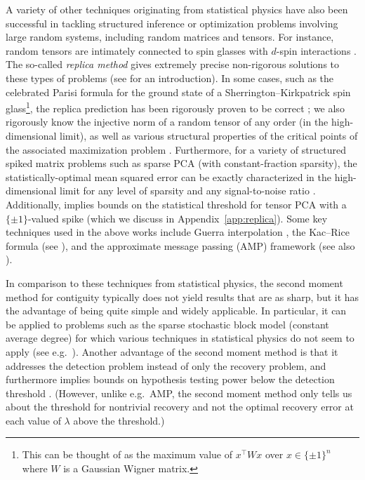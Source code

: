 \documentclass{article}
\begin{document}
A variety of other techniques originating from statistical physics have also been successful in tackling structured inference or optimization problems involving large random systems, including random matrices and tensors. For instance, random tensors are intimately connected to spin glasses with $d$-spin interactions \cite{gardner,cs92}. The so-called \emph{replica method} gives extremely precise non-rigorous solutions to these types of problems (see \cite{mm-book} for an introduction). In some cases, such as the celebrated Parisi formula for the ground state of a Sherrington--Kirkpatrick spin glass\footnote{This can be thought of as the maximum value of $x^\top W x$ over $x \in \{\pm 1\}^n$ where $W$ is a Gaussian Wigner matrix.}, the replica prediction has been rigorously proven to be correct \cite{tal06parisi}; we also rigorously know the injective norm of a random tensor of any order (in the high-dimensional limit), as well as various structural properties of the critical points of the associated maximization problem \cite{tal06,abac,subag-pspin}. Furthermore, for a variety of structured spiked matrix problems such as sparse PCA (with constant-fraction sparsity), the statistically-optimal mean squared error can be exactly characterized in the high-dimensional limit for any level of sparsity and any signal-to-noise ratio \cite{mi,mi-proof,lelarge-limits-lowrank}. Additionally, \cite{km} implies bounds on the statistical threshold for tensor PCA with a $\{\pm 1\}$-valued spike (which we discuss in Appendix~\ref{app:replica}). Some key techniques used in the above works include Guerra interpolation \cite{guerra}, the Kac--Rice formula (see \cite{abac}), and the approximate message passing (AMP) framework \cite{amp-cs,amp-mot,bm,jm} (see also \cite{sparse-pca-amp,dam,nonneg-pca,mi-proof}).

In comparison to these techniques from statistical physics, the second moment method for contiguity typically does not yield results that are as sharp, but it has the advantage of being quite simple and widely applicable. In particular, it can be applied to problems such as the sparse stochastic block model \cite{mns,bmnn} (constant average degree) for which various techniques in statistical physics do not seem to apply (see e.g.\ \cite{dam,lelarge-limits-lowrank}). Another advantage of the second moment method is that it addresses the detection problem instead of only the recovery problem, and furthermore implies bounds on hypothesis testing power below the detection threshold \cite{pwbm}. (However, unlike e.g.\ AMP, the second moment method only tells us about the threshold for nontrivial recovery and not the optimal recovery error at each value of $\lambda$ above the threshold.)
\end{document}
